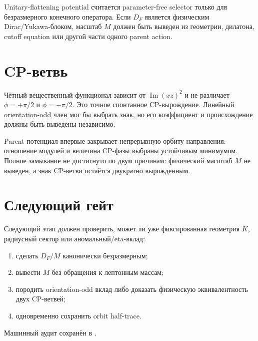 \begin{nogocriterion}
Unitary-flattening potential считается parameter-free selector только для
безразмерного конечного оператора. Если \(D_F\) является физическим
Dirac/Yukawa-блоком, масштаб \(M\) должен быть выведен из геометрии,
дилатона, cutoff equation или другой части одного parent action.
\end{nogocriterion}

\section{CP-ветвь}

Чётный вещественный функционал зависит от
\(\operatorname{Im}(xz)^2\) и не различает
\(\phi=+\pi/2\) и \(\phi=-\pi/2\). Это точное спонтанное
CP-вырождение. Линейный orientation-odd член мог бы выбрать знак, но его
коэффициент и происхождение должны быть выведены независимо.

\begin{proposition}
Parent-потенциал впервые закрывает непрерывную орбиту направления:
отношение модулей и величина CP-фазы выбраны устойчивым минимумом. Полное
замыкание не достигнуто по двум причинам: физический масштаб \(M\) не
выведен, а знак CP-ветви остаётся двукратно вырожденным.
\end{proposition}

\section{Следующий гейт}

Следующий этап должен проверить, может ли уже фиксированная геометрия
\(K\), радиусный сектор или аномальный/eta-вклад:
\begin{enumerate}
 \item сделать \(D_F/M\) канонически безразмерным;
 \item вывести \(M\) без обращения к лептонным массам;
 \item породить orientation-odd вклад либо доказать физическую
 эквивалентность двух CP-ветвей;
 \item одновременно сохранить orbit half-trace.
\end{enumerate}

Машинный аудит сохранён в
.